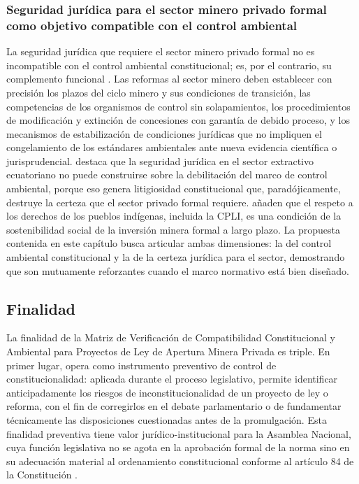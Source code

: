 \subsubsection{Seguridad jurídica para el sector minero privado formal como objetivo compatible con el control ambiental}

La seguridad jurídica que requiere el sector minero privado formal no es incompatible con el control ambiental constitucional; es, por el contrario, su complemento funcional \parencite{bustamante_2012,ochoa_jimenez_2024}. Las reformas al sector minero deben establecer con precisión los plazos del ciclo minero y sus condiciones de transición, las competencias de los organismos de control sin solapamientos, los procedimientos de modificación y extinción de concesiones con garantía de debido proceso, y los mecanismos de estabilización de condiciones jurídicas que no impliquen el congelamiento de los estándares ambientales ante nueva evidencia científica o jurisprudencial. \textcite{lozano_espinosa_2023} destaca que la seguridad jurídica en el sector extractivo ecuatoriano no puede construirse sobre la debilitación del marco de control ambiental, porque eso genera litigiosidad constitucional que, paradójicamente, destruye la certeza que el sector privado formal requiere. \textcite{grefa_valencia_2021} añaden que el respeto a los derechos de los pueblos indígenas, incluida la CPLI, es una condición de la sostenibilidad social de la inversión minera formal a largo plazo. La propuesta contenida en este capítulo busca articular ambas dimensiones: la del control ambiental constitucional y la de la certeza jurídica para el sector, demostrando que son mutuamente reforzantes cuando el marco normativo está bien diseñado.

\subsection{Finalidad}

La finalidad de la Matriz de Verificación de Compatibilidad Constitucional y Ambiental para Proyectos de Ley de Apertura Minera Privada es triple. En primer lugar, opera como instrumento preventivo de control de constitucionalidad: aplicada durante el proceso legislativo, permite identificar anticipadamente los riesgos de inconstitucionalidad de un proyecto de ley o reforma, con el fin de corregirlos en el debate parlamentario o de fundamentar técnicamente las disposiciones cuestionadas antes de la promulgación. Esta finalidad preventiva tiene valor jurídico-institucional para la Asamblea Nacional, cuya función legislativa no se agota en la aprobación formal de la norma sino en su adecuación material al ordenamiento constitucional conforme al artículo 84 de la Constitución \parencite{cre_2008,manual_tecnica_legislativa_an}.

